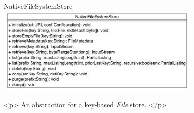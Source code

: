 \begin{XeClass}{NativeFileSystemStore}
\includegraphics[width=10cm]{cdig/NativeFileSystemStore.png}
     
 <p>
 An abstraction for a key-based \emph{File} store.
 </p>

\end{XeClass}
